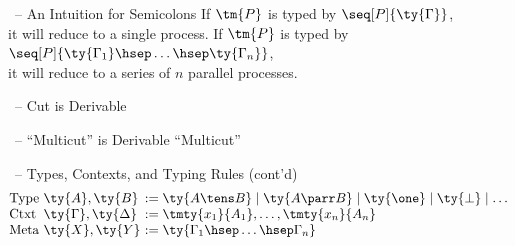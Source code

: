 \documentclass[aspectratio=169,xcolor={dvipsnames,table}]{beamer}
\begin{document}
\begin{frame}{\hccp\ -- An Intuition for Semicolons}
  \centering\Large
  If $\tm{P}$ is typed by $\seq[P]{\ty{\Gamma}}$,\\
  it will reduce to a single process.
  \vfill
  If $\tm{P}$ is typed by $\seq[P]{\ty{\Gamma_1}\hsep\dots\hsep\ty{\Gamma_n}}$,\\
  it will reduce to a series of $n$ parallel processes.
\end{frame}

\begin{frame}{\hccp\ -- Cut is Derivable}
  \centering\Large
  \vfill
  \begin{prooftree}
  \end{prooftree}
\end{frame}

\begin{frame}{\hccp\ -- ``Multicut'' is Derivable}
  \centering\Large
  \vfill
  ``Multicut''
  \begin{prooftree}
  \end{prooftree}
\end{frame}

\begin{frame}[label=hccp2]{\hccp\ -- Types, Contexts, and Typing Rules (cont'd)}
  \centering\Large
  \vfill
  \[\!
    \arraycolsep=0.16667em
    \begin{array}{lll}
      \text{Type} & \ty{A},\ty{B}
      & := \ty{A \tens B} \mid \ty{A \parr B}
        \mid \ty{\one} \mid \ty{\bot}
        \mid \dots
      \\
      \text{Ctxt} & \ty{\Gamma},\ty{\Delta}
      & := \tmty{x_1}{A_1},\dots,\tmty{x_n}{A_n}
      \\
      \text{Meta} & \ty{X},\ty{Y}
      & := \ty{\Gamma_1\hsep\dots\hsep\Gamma_n}
    \end{array}
  \]
  \begin{center}
    \hccpInfBoundTens
    \hccpInfParr
  \end{center}
  \begin{center}
    \hccpInfOne
    \hccpInfBot
  \end{center} 
  \vfill
\end{frame}
\end{document}
